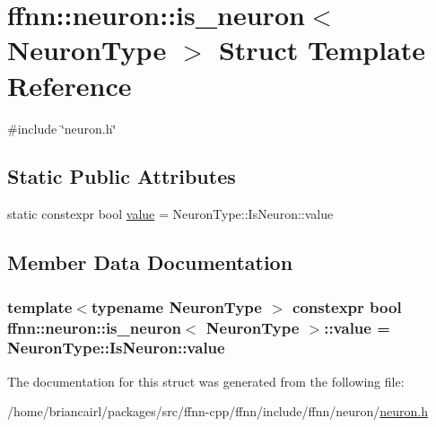 \hypertarget{structffnn_1_1neuron_1_1is__neuron}{\section{ffnn\-:\-:neuron\-:\-:is\-\_\-neuron$<$ Neuron\-Type $>$ Struct Template Reference}
\label{structffnn_1_1neuron_1_1is__neuron}
}


{\ttfamily \#include \char`\"{}neuron.\-h\char`\"{}}

\subsection*{Static Public Attributes}
\begin{DoxyCompactItemize}
\item 
static constexpr bool \hyperlink{structffnn_1_1neuron_1_1is__neuron_adfafc315a5352f2a186959d8402490d1}{value} = Neuron\-Type\-::\-Is\-Neuron\-::value
\end{DoxyCompactItemize}


\subsection{Member Data Documentation}
\hypertarget{structffnn_1_1neuron_1_1is__neuron_adfafc315a5352f2a186959d8402490d1}{
\subsubsection[{value}]{\setlength{\rightskip}{0pt plus 5cm}template$<$typename Neuron\-Type $>$ constexpr bool {\bf ffnn\-::neuron\-::is\-\_\-neuron}$<$ Neuron\-Type $>$\-::value = Neuron\-Type\-::\-Is\-Neuron\-::value\hspace{0.3cm}{\ttfamily [static]}}}\label{structffnn_1_1neuron_1_1is__neuron_adfafc315a5352f2a186959d8402490d1}


The documentation for this struct was generated from the following file\-:\begin{DoxyCompactItemize}
\item 
/home/briancairl/packages/src/ffnn-\/cpp/ffnn/include/ffnn/neuron/\hyperlink{neuron_8h}{neuron.\-h}\end{DoxyCompactItemize}
